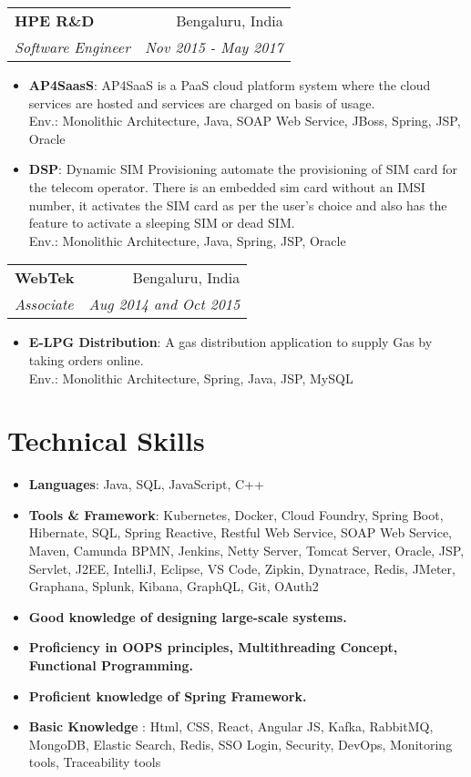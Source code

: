 \documentclass[letterpaper,11pt]{article}
\makeatletter
\newcommand{\resumeItem}[2]{
  \item\small{
    \textbf{#1}{: #2 \vspace{-2pt}}
  }
}
\newcommand{\resumeSubheading}[4]{
  \vspace{-1pt}\item
    \begin{tabular*}{0.97\textwidth}{l@{\extracolsep{\fill}}r}
      \textbf{#1} & #2 \\
      \textit{\small#3} & \textit{\small #4} \\
    \end{tabular*}\vspace{-5pt}
}
\newcommand{\resumeSubHeadingListStart}{\begin{itemize}[leftmargin=*]}
\newcommand{\resumeSubHeadingListEnd}{\end{itemize}}
\newcommand{\resumeItemListStart}{\begin{itemize}}
\newcommand{\resumeItemListEnd}{\end{itemize}\vspace{-5pt}}
\makeatother
\begin{document}
    \resumeSubheading
      {HPE R\&D}{Bengaluru, India}
      {Software Engineer}{Nov 2015 - May 2017}
      \resumeItemListStart
        \resumeItem{AP4SaasS}
          {AP4SaaS is a PaaS cloud platform system where the cloud services are hosted and services are charged on basis of usage. \\ Env.: Monolithic Architecture, Java, SOAP Web Service, JBoss, Spring, JSP, Oracle}
        \resumeItem{DSP}
          {Dynamic SIM Provisioning automate the provisioning of SIM card for the telecom operator. There is an embedded sim card without an IMSI number, it activates the SIM card as per the user's choice and also has the feature to activate a sleeping SIM or dead SIM. \\ Env.: Monolithic Architecture, Java, Spring, JSP, Oracle}
      \resumeItemListEnd

    \resumeSubheading
      {WebTek}{Bengaluru, India}
      {Associate}{Aug 2014 and Oct 2015}
      \resumeItemListStart
        \resumeItem{E-LPG Distribution}
          {A gas distribution application to supply Gas by taking orders online. \\ Env.: Monolithic Architecture, Spring, Java, JSP, MySQL}

  \resumeSubHeadingListEnd

\section{Technical Skills}
 \resumeSubHeadingListStart
   \item{
     \textbf{Languages}{: Java, SQL, JavaScript, C++}
     \hfill
   }
    \item{
     \textbf{Tools \& Framework}{: Kubernetes, Docker, Cloud Foundry, Spring Boot, Hibernate, SQL, Spring Reactive, Restful Web Service, SOAP Web Service, Maven, Camunda BPMN, Jenkins, Netty Server, Tomcat Server, Oracle, JSP, Servlet, J2EE, IntelliJ, Eclipse, VS Code, Zipkin, Dynatrace, Redis, JMeter, Graphana, Splunk, Kibana, GraphQL, Git, OAuth2}
   }
    \item{
     \textbf{Good knowledge of designing large-scale systems.}{}
     \hfill
   }
   \item{
     \textbf{Proficiency in OOPS principles, Multithreading Concept, Functional Programming.}{}
     \hfill
   }
    \item{
     \textbf{Proficient knowledge of Spring Framework.}{}
     \hfill
   }
    \item{
     \textbf{Basic Knowledge }{: Html, CSS, React, Angular JS, Kafka, RabbitMQ, MongoDB, Elastic Search, Redis, SSO Login, Security, DevOps, Monitoring tools, Traceability tools}
     \hfill
   }
 \resumeSubHeadingListEnd


\end{document}
